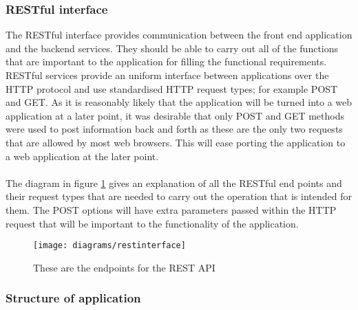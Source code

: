 \subsubsection*{RESTful interface}

The RESTful interface provides communication between the front end application and the backend services. They should be able to carry out all of the functions that are important to the application for filling the functional requirements. RESTful services provide an uniform interface between applications over the HTTP protocol and use standardised HTTP request types; for example POST and GET. As it is reasonably likely that the application will be turned into a web application at a later point, it was desirable that only POST and GET methods were used to post information back and forth as these are the only two requests that are allowed by most web browsers. This will ease porting the application to a web application at the later point.\\
\\
The diagram in figure \ref{fig:rest_pai_diagram_image} gives an explanation of all the RESTful end points and their request types that are needed to carry out the operation that is intended for them. The POST options will have extra parameters passed within the HTTP request that will be important to the functionality of the application. 

\begin{figure}[H]
    \centering
    \texttt{[image: diagrams/restinterface]}
    \caption{These are the endpoints for the REST API}
    \label{fig:rest_pai_diagram_image}
\end{figure} 

\subsubsection*{Structure of application}

